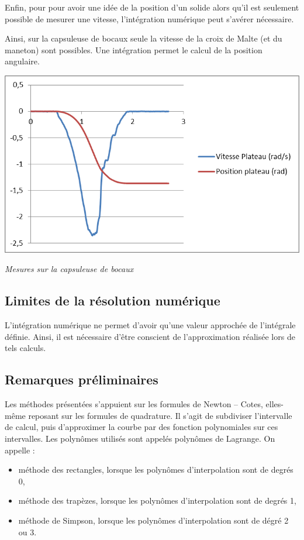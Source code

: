 \documentclass[10pt]{article}
\begin{document}
\begin{minipage}[c]{.47\linewidth}
Enfin, pour pour avoir une idée de la position d'un solide alors qu'il est seulement possible de mesurer une vitesse, l'intégration numérique peut s'avérer nécessaire.

Ainsi, sur la capsuleuse de bocaux seule la vitesse de la croix de Malte (et du maneton) sont possibles. Une intégration permet le calcul de la position angulaire.
\end{minipage}\hfill
\begin{minipage}[c]{.47\linewidth}
\begin{center}
\includegraphics[width=.95\textwidth]{images/capsuleuse}

\textit{Mesures sur la capsuleuse de bocaux}
\end{center}
\end{minipage}

\subsection{Limites de la résolution numérique}
\begin{warn}
L'intégration numérique ne permet d'avoir qu'une valeur approchée de l'intégrale définie. 
Ainsi, il est nécessaire d'être conscient de l'approximation réalisée lors de tels calculs.
\end{warn}

\subsection{Remarques préliminaires}

Les méthodes présentées s'appuient sur les formules de Newton -- Cotes, elles-même reposant sur les formules de quadrature. Il s'agit de subdiviser l'intervalle de calcul, puis d'approximer la courbe par des fonction polynomiales sur ces intervalles. Les polynômes utilisés sont appelés polynômes de Lagrange. On appelle :
\begin{itemize}
\item méthode des rectangles, lorsque les polynômes d'interpolation sont de degrés 0,
\item méthode des trapèzes, lorsque les polynômes d'interpolation sont de degrés 1,
\item méthode de Simpson, lorsque les polynômes d'interpolation sont de dégré 2 ou 3. 
\end{itemize}
\end{document}
